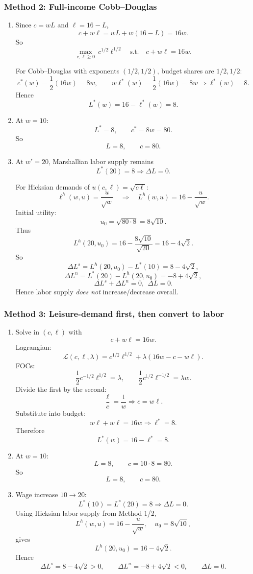 \documentclass[12pt]{article}
\begin{document}
\subsubsection*{Method 2: Full-income Cobb--Douglas}

\begin{enumerate}[label=(\alph*)]
\item Since \(c=wL\) and \(\ell=16-L\),
\[
c+w\ell = wL+w(16-L)=16w.
\]
So
\[
\max_{c,\ell\ge 0}\ c^{1/2}\ell^{1/2}\quad \text{s.t.}\quad c+w\ell=16w.
\]

For Cobb--Douglas with exponents \((1/2,1/2)\), budget shares are \(1/2,1/2\):
\[
c^*(w)=\frac12(16w)=8w,\qquad w\ell^*(w)=\frac12(16w)=8w
\Rightarrow \ell^*(w)=8.
\]
Hence
\[
\boxed{L^*(w)=16-\ell^*(w)=8.}
\]

\item At \(w=10\):
\[
L^*=8,\qquad c^*=8w=80.
\]
So
\[
\boxed{L=8,\qquad c=80.}
\]

\item At \(w'=20\), Marshallian labor supply remains
\[
L^*(20)=8 \Rightarrow \Delta L=0.
\]

For Hicksian demands of \(u(c,\ell)=\sqrt{c\ell}\):
\[
\ell^h(w,u)=\frac{u}{\sqrt w}
\quad\Rightarrow\quad
L^h(w,u)=16-\frac{u}{\sqrt w}.
\]
Initial utility:
\[
u_0=\sqrt{80\cdot 8}=8\sqrt{10}.
\]
Thus
\[
L^h(20,u_0)=16-\frac{8\sqrt{10}}{\sqrt{20}}=16-4\sqrt2.
\]
So
\[
\Delta L^s=L^h(20,u_0)-L^*(10)=8-4\sqrt2,
\]
\[
\Delta L^n=L^*(20)-L^h(20,u_0)=-8+4\sqrt2,
\]
\[
\boxed{\Delta L^s+\Delta L^n=0,\ \ \Delta L=0.}
\]
Hence labor supply \emph{does not} increase/decrease overall.
\end{enumerate}

\subsubsection*{Method 3: Leisure-demand first, then convert to labor}

\begin{enumerate}[label=(\alph*)]
\item Solve in \((c,\ell)\) with
\[
c+w\ell=16w.
\]
Lagrangian:
\[
\mathcal L(c,\ell,\lambda)=c^{1/2}\ell^{1/2}+\lambda(16w-c-w\ell).
\]
FOCs:
\[
\frac{1}{2}c^{-1/2}\ell^{1/2}=\lambda,\qquad
\frac{1}{2}c^{1/2}\ell^{-1/2}=\lambda w.
\]
Divide the first by the second:
\[
\frac{\ell}{c}=\frac1w \Rightarrow c=w\ell.
\]
Substitute into budget:
\[
w\ell+w\ell=16w \Rightarrow \ell^*=8.
\]
Therefore
\[
\boxed{L^*(w)=16-\ell^*=8.}
\]

\item At \(w=10\):
\[
L=8,\qquad c=10\cdot 8=80.
\]
So
\[
\boxed{L=8,\qquad c=80.}
\]

\item Wage increase \(10\to 20\):
\[
L^*(10)=L^*(20)=8 \Rightarrow \Delta L=0.
\]
Using Hicksian labor supply from Method 1/2,
\[
L^h(w,u)=16-\frac{u}{\sqrt w},
\quad u_0=8\sqrt{10},
\]
gives
\[
L^h(20,u_0)=16-4\sqrt2.
\]
Hence
\[
\boxed{\Delta L^s=8-4\sqrt2>0,\qquad \Delta L^n=-8+4\sqrt2<0,\qquad \Delta L=0.}
\]
\end{enumerate}
\end{document}
